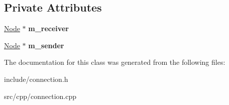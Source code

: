 \subsection*{Private Attributes}
\begin{DoxyCompactItemize}
\item 
\mbox{\label{classConnection_a508ae4ca471baad98e9ace730e8ab500}} 
\mbox{\hyperlink{classNode}{Node}} $\ast$ {\bfseries m\+\_\+receiver}
\item 
\mbox{\label{classConnection_aa6eb9bca71cf1144595325a4c47182b9}} 
\mbox{\hyperlink{classNode}{Node}} $\ast$ {\bfseries m\+\_\+sender}
\end{DoxyCompactItemize}


The documentation for this class was generated from the following files\+:\begin{DoxyCompactItemize}
\item 
include/connection.\+h\item 
src/cpp/connection.\+cpp\end{DoxyCompactItemize}
